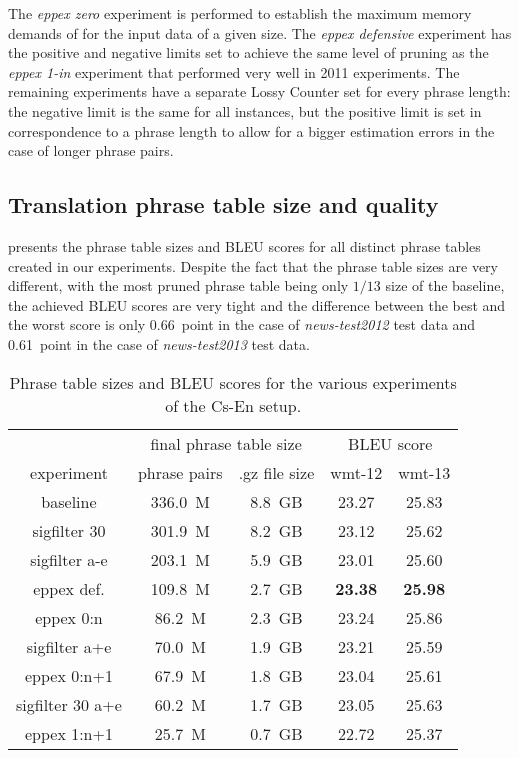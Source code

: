 The \emph{eppex zero} experiment is performed to establish the maximum memory demands of \eppex{}
for the input data of a given size.
The \emph{eppex defensive} experiment has the positive and negative limits set to achieve the same
level of pruning as the \emph{eppex 1-in} experiment that performed very well in 2011 experiments.
The remaining \eppex{} experiments have a separate Lossy Counter set for every phrase length:
the negative limit is the same for all instances, but the positive limit is set in correspondence
to a phrase length to allow for a bigger estimation errors in the case of longer phrase pairs.

\subsection{Translation phrase table size and quality}

 presents the phrase table sizes and BLEU scores for all
distinct phrase tables created in our experiments.
Despite the fact that the phrase table sizes are very different, with the most pruned phrase table being
only $1/13$ size of the baseline, the achieved BLEU scores are very tight and the difference
between the best and the worst score is only 0.66~point in the case of \emph{news-test2012} test data
and 0.61~point in the case of \emph{news-test2013} test data.

\begin{table}[ht]
\centering
\begin{tabular}{ | c | c c | c c | }
\hline
 & \multicolumn{2}{|c|}{final phrase table size} & \multicolumn{2}{|c|}{BLEU score} \\
experiment & phrase pairs & .gz file size & wmt-12 & wmt-13 \\
\hline
\hline
baseline          & 336.0~M & 8.8~GB & 23.27 & 25.83 \\
sigfilter 30      & 301.9~M & 8.2~GB & 23.12 & 25.62 \\
sigfilter a-e     & 203.1~M & 5.9~GB & 23.01 & 25.60 \\
eppex def.        & 109.8~M & 2.7~GB & \textbf{23.38} & \textbf{25.98} \\
eppex 0:n         &  86.2~M & 2.3~GB & 23.24 & 25.86 \\
sigfilter a+e     &  70.0~M & 1.9~GB & 23.21 & 25.59 \\
eppex 0:n+1       &  67.9~M & 1.8~GB & 23.04 & 25.61 \\
sigfilter 30 a+e  &  60.2~M & 1.7~GB & 23.05 & 25.63 \\
eppex 1:n+1       &  25.7~M & 0.7~GB & 22.72 & 25.37 \\
\hline
\end{tabular}
\caption{\label{cs-en-wmt13-pt-size-and-bleu}
Phrase table sizes and BLEU scores for the various experiments of the Cs-En setup.}
\end{table}

